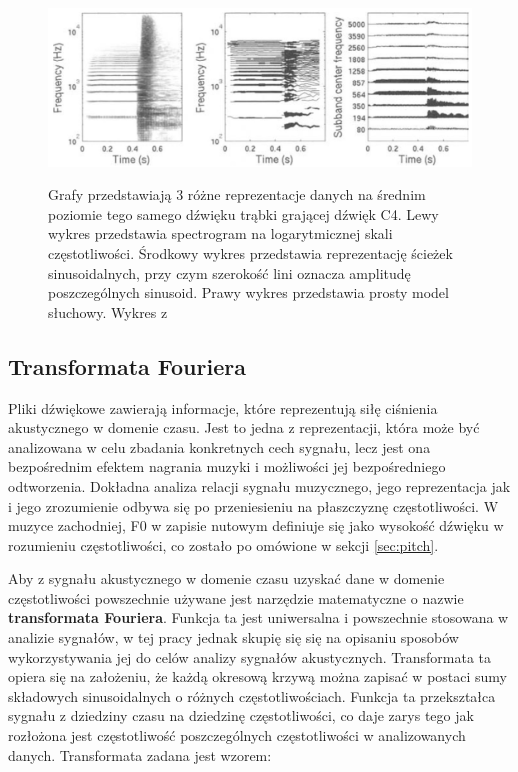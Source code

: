 \documentclass[12pt,a4paper,twoside]{mwart}
\begin{document}
\begin{figure}[t]
  \begin{center}
  \includegraphics[scale=0.3]{images/mid_level_representation.jpg}\\
  \caption{Grafy przedstawiają 3 różne reprezentacje danych na średnim poziomie tego samego dźwięku trąbki grającej dźwięk C4. Lewy wykres przedstawia spectrogram na logarytmicznej skali częstotliwości. Środkowy wykres przedstawia reprezentację ścieżek sinusoidalnych, przy czym szerokość lini oznacza amplitudę poszczególnych sinusoid. Prawy wykres przedstawia prosty model słuchowy. Wykres z 
  \cite[14]{Transcription:Anssi:SignalProcessingMethods}
  }
  \label{fig:mid_level_representation}
  \end{center}
\end{figure}

\subsection{Transformata Fouriera}\label{sec:TF}
Pliki dźwiękowe zawierają informacje, które reprezentują siłę ciśnienia akustycznego w domenie czasu. Jest to jedna z reprezentacji, która może być analizowana w celu zbadania konkretnych cech sygnału, lecz jest ona bezpośrednim efektem nagrania muzyki i możliwości jej bezpośredniego odtworzenia. Dokładna analiza relacji sygnału muzycznego, jego reprezentacja jak i jego zrozumienie odbywa się po przeniesieniu na płaszczyznę częstotliwości. W muzyce zachodniej, F0 w zapisie nutowym definiuje się jako wysokość dźwięku w rozumieniu częstotliwości, co zostało po omówione w sekcji \ref{sec:pitch}.

Aby z sygnału akustycznego w domenie czasu uzyskać dane w domenie częstotliwości powszechnie używane jest narzędzie matematyczne o nazwie \textbf{transformata Fouriera}. Funkcja ta jest uniwersalna i powszechnie stosowana w analizie sygnałów, w tej pracy jednak skupię się się na opisaniu sposobów wykorzystywania jej do celów analizy sygnałów akustycznych. Transformata ta opiera się na założeniu, że każdą okresową krzywą można zapisać w postaci sumy składowych sinusoidalnych o różnych częstotliwościach. Funkcja ta przekształca sygnału z dziedziny czasu na dziedzinę częstotliwości, co daje zarys tego jak rozłożona jest częstotliwość poszczególnych częstotliwości w analizowanych danych. Transformata zadana jest wzorem:
\end{document}
